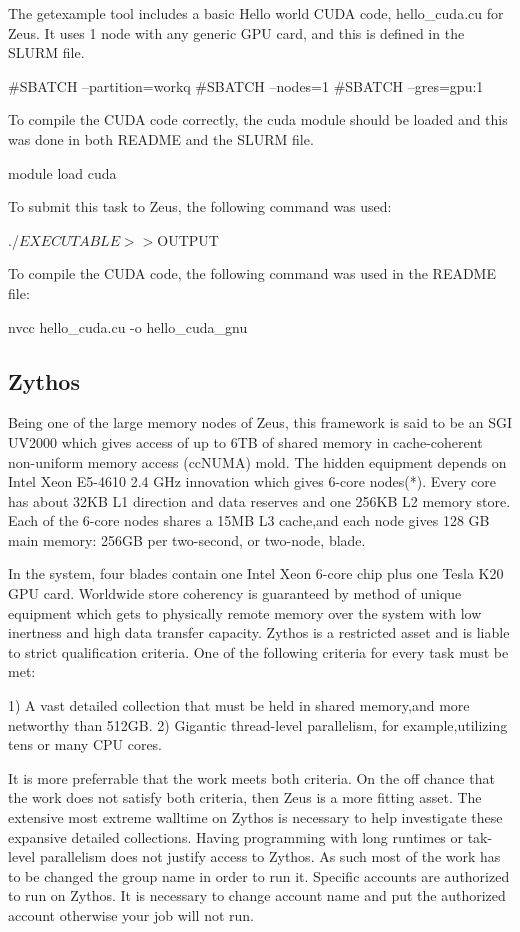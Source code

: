 \documentclass[journal]{IEEEtran}
\begin{document}
The getexample tool includes a basic Hello world CUDA code, hello_cuda.cu for Zeus. It uses 1 node with any generic GPU card, and this is defined in the 
SLURM file.

#SBATCH --partition=workq
#SBATCH --nodes=1
#SBATCH --gres=gpu:1

To compile the CUDA code correctly, the cuda module should be loaded and this was done in both README and the SLURM file.

module load cuda

To submit this task to Zeus, the following command was used:

./$EXECUTABLE >> ${OUTPUT}

To compile the CUDA code, the following command was used in the README file:

nvcc hello_cuda.cu -o hello_cuda_gnu
 
  
\subsection{Zythos}

Being one of the large memory nodes of Zeus, this framework is said to be an SGI UV2000 which gives access of up to 6TB of shared memory in cache-coherent non-uniform memory access (ccNUMA) mold.
The hidden equipment depends on Intel Xeon E5-4610 2.4 GHz innovation which gives 6-core nodes(*). 
Every core has about 32KB L1 direction and data reserves and one 256KB L2 memory store. 
Each of the 6-core nodes shares a 15MB L3 cache,and each node gives 128 GB main memory: 256GB per two-second, or two-node, blade.

In the system, four blades contain one Intel Xeon 6-core chip plus one Tesla K20 GPU card.
Worldwide store coherency is guaranteed by method of unique equipment which gets to physically remote memory over the system with low inertness and high data transfer capacity.
Zythos is a restricted asset and is liable to strict qualification criteria. 
One of the following criteria for every task must be met:

1) A vast detailed collection that must be held in shared memory,and more networthy than 512GB.
2) Gigantic thread-level parallelism, for example,utilizing tens or many CPU cores.

It is more preferrable that the work meets both criteria. 
On the off chance that the work does not satisfy both criteria, then Zeus is a more fitting asset.
The extensive most extreme walltime on Zythos is necessary to help investigate these expansive detailed collections.
Having programming with long runtimes or tak-level parallelism does not justify access to Zythos.
As such most of the work has to be changed the group name in order to run it. 
Specific accounts are authorized to run on Zythos. It is necessary to change account name and put the authorized account otherwise your job will not run.
\end{document}
